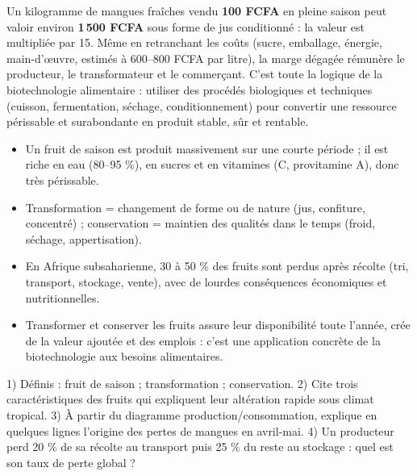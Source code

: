 \documentclass[11pt]{article}
\newcommand{\cle}[1]{{\popxbold\color{popdark}#1}}
\begin{document}
\begin{exemplebox}
Un kilogramme de mangues fraîches vendu \textbf{100 FCFA} en pleine saison peut valoir environ \textbf{1\,500 FCFA} sous forme de jus conditionné : la valeur est multipliée par 15. Même en retranchant les coûts (sucre, emballage, énergie, main-d'œuvre, estimés à 600--800 FCFA par litre), la marge dégagée rémunère le producteur, le transformateur et le commerçant. C'est toute la logique de la \cle{biotechnologie} alimentaire : utiliser des procédés biologiques et techniques (cuisson, fermentation, séchage, conditionnement) pour convertir une ressource périssable et surabondante en produit stable, sûr et rentable.
\end{exemplebox}

\begin{aretenir}
\begin{itemize}
\item Un \cle{fruit de saison} est produit massivement sur une courte période ; il est riche en eau (80--95 \%), en sucres et en vitamines (C, provitamine A), donc très périssable.
\item \cle{Transformation} = changement de forme ou de nature (jus, confiture, concentré) ; \cle{conservation} = maintien des qualités dans le temps (froid, séchage, appertisation).
\item En Afrique subsaharienne, 30 à 50 \% des fruits sont perdus après récolte (tri, transport, stockage, vente), avec de lourdes conséquences économiques et nutritionnelles.
\item Transformer et conserver les fruits assure leur disponibilité toute l'année, crée de la valeur ajoutée et des emplois : c'est une application concrète de la biotechnologie aux besoins alimentaires.
\end{itemize}
\end{aretenir}

\begin{exercice}
1) Définis : fruit de saison ; transformation ; conservation. 2) Cite trois caractéristiques des fruits qui expliquent leur altération rapide sous climat tropical. 3) À partir du diagramme production/consommation, explique en quelques lignes l'origine des pertes de mangues en avril-mai. 4) Un producteur perd 20 \% de sa récolte au transport puis 25 \% du reste au stockage : quel est son taux de perte global ?
\end{exercice}
\end{document}
